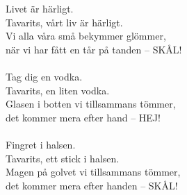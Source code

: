 
Livet är härligt. \\ Tavarits, vårt liv är härligt. \\ Vi alla våra små bekymmer glömmer, \\ när vi har fått en tår på tanden -- SKÅL! \\ \hspace{10mm} \\ Tag dig en vodka. \\ Tavarits, en liten vodka. \\ Glasen i botten vi tillsammans tömmer, \\ det kommer mera efter hand -- HEJ! \\ \hspace{10mm} \\ Fingret i halsen. \\ Tavarits, ett stick i halsen. \\ Magen på golvet vi tillsammans tömmer, \\ det kommer mera efter handen -- SKÅL!